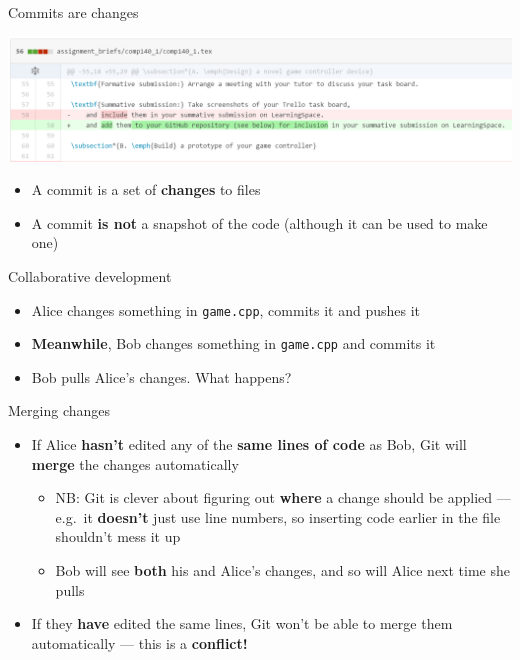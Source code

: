 \begin{frame}{Commits are changes}
    \begin{center}
        \includegraphics[width=\textwidth]{diff}
    \end{center}

    \begin{itemize}
        \item A commit is a set of \textbf{changes} to files
        \item A commit \textbf{is not} a snapshot of the code (although it can be used to make one)
    \end{itemize}
\end{frame}

\begin{frame}{Collaborative development}
    \begin{itemize}
        \item Alice changes something in \texttt{game.cpp}, commits it and pushes it
        \item \textbf{Meanwhile}, Bob changes something in \texttt{game.cpp} and commits it
        \item Bob pulls Alice's changes. What happens?
    \end{itemize}
\end{frame}

\begin{frame}{Merging changes}
    \begin{itemize}
        \item If Alice \textbf{hasn't} edited any of the \textbf{same lines of code} as Bob,
            Git will \textbf{merge} the changes automatically
            \begin{itemize}
                \item NB: Git is clever about figuring out \textbf{where} a change should be applied ---
                    e.g.\ it \textbf{doesn't} just use line numbers,
                    so inserting code earlier in the file shouldn't mess it up
                \item Bob will see \textbf{both} his and Alice's changes, and so will Alice next time she pulls
            \end{itemize}
        \item If they \textbf{have} edited the same lines, Git won't be able to merge them automatically
            --- this is a \textbf{conflict!}
    \end{itemize}
\end{frame}

